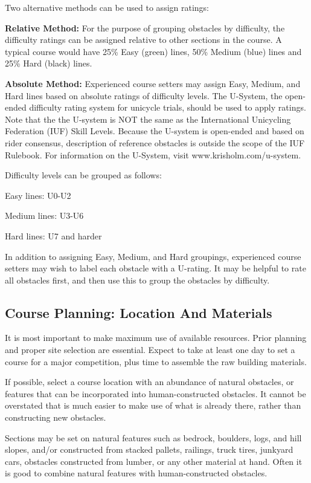 Two alternative methods can be used to assign ratings:

\textbf{Relative Method:}
For the purpose of grouping obstacles by difficulty, the difficulty ratings can be assigned relative to other sections in the course.
A typical course would have 25\% Easy (green) lines, 50\% Medium (blue) lines and 25\% Hard (black) lines.

\textbf{Absolute Method:}
Experienced course setters may assign Easy, Medium, and Hard lines based on absolute ratings of difficulty levels.
The U-System, the open-ended difficulty rating system for unicycle trials, should be used to apply ratings.
Note that the the U-system is NOT the same as the International Unicycling Federation (IUF) Skill Levels.
Because the U-system is open-ended and based on rider consensus, description of reference obstacles is outside the scope of the IUF Rulebook.
For information on the U-System, visit www.krisholm.com/u-system.

Difficulty levels can be grouped as follows:

Easy lines: U0-U2

Medium lines: U3-U6

Hard lines: U7 and harder

In addition to assigning Easy, Medium, and Hard groupings, experienced course setters may wish to label each obstacle with a U-rating.
It may be helpful to rate all obstacles first, and then use this to group the obstacles by difficulty.

\subsection{Course Planning: Location And Materials}
It is most important to make maximum use of available resources.
Prior planning and proper site selection are essential.
Expect to take at least one day to set a course for a major competition, plus time to assemble the raw building materials.

If possible, select a course location with an abundance of natural obstacles, or features that can be incorporated into human-constructed obstacles.
It cannot be overstated that is much easier to make use of what is already there, rather than constructing new obstacles.

Sections may be set on natural features such as bedrock, boulders, logs, and hill slopes, and/or constructed from stacked pallets, railings, truck tires, junkyard cars, obstacles constructed from lumber, or any other material at hand.
Often it is good to combine natural features with human-constructed obstacles.

